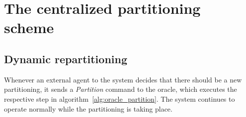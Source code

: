 \section{The centralized partitioning scheme}



\subsection{Dynamic repartitioning}
Whenever an external agent to the system decides that there should be a new partitioning, it sends a \emph{Partition} command to the oracle, which executes the respective step in algorithm~\ref{alg:oracle_partition}. The system continues to operate normally while the partitioning is taking place.



